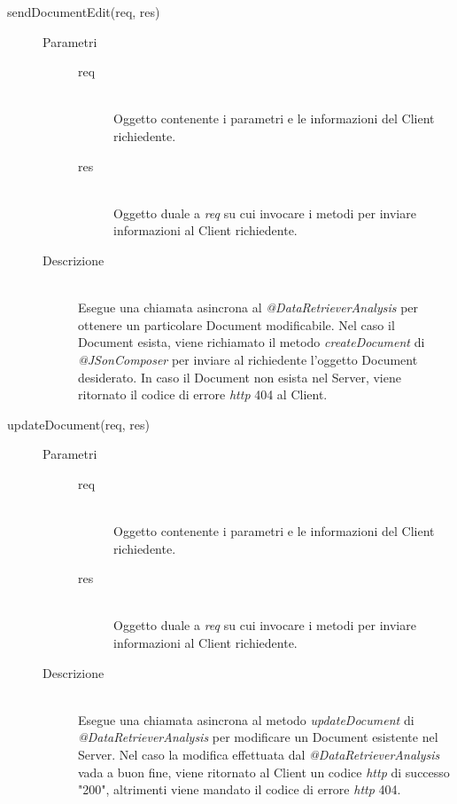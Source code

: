 \begin{description}
\begin{description}
 \item[sendDocumentEdit(req, res)] \hfill 
 \begin{description}
 \item[Parametri] \hfill
  \begin{description}
   \item[req] \hfill \\
   Oggetto contenente i parametri e le informazioni del Client richiedente.
   \item[res] \hfill \\
   Oggetto duale a \textit{req} su cui invocare i metodi per inviare informazioni al Client richiedente.
  \end{description}
 \item[Descrizione] \hfill \\
 Esegue una chiamata asincrona al \textit{@DataRetrieverAnalysis} per ottenere un particolare Document modificabile. Nel caso il Document esista, viene richiamato il metodo \textit{createDocument} di \textit{@JSonComposer} per inviare al richiedente l'oggetto Document desiderato. In caso il Document non esista nel Server, viene ritornato il codice di errore \textit{http} 404 al Client.
 \end{description}
 
 \item[updateDocument(req, res)] \hfill 
 \begin{description}
 \item[Parametri] \hfill
  \begin{description}
   \item[req] \hfill \\
   Oggetto contenente i parametri e le informazioni del Client richiedente.
   \item[res] \hfill \\
   Oggetto duale a \textit{req} su cui invocare i metodi per inviare informazioni al Client richiedente.
  \end{description}
 \item[Descrizione] \hfill \\
 Esegue una chiamata asincrona al metodo \textit{updateDocument} di \textit{@DataRetrieverAnalysis} per modificare un Document esistente nel Server. Nel caso la modifica effettuata dal \textit{@DataRetrieverAnalysis} vada a buon fine, viene ritornato al Client un codice \textit{http} di successo "200", altrimenti viene mandato il codice di errore \textit{http} 404.
 \end{description}
 

\end{description}
\end{description}
